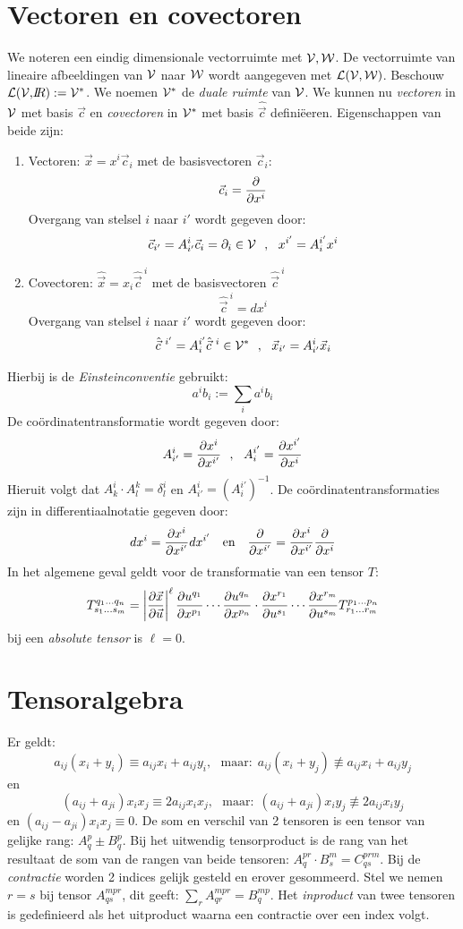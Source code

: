 \documentclass[twoside]{report}
\begin{document}
\section{Vectoren en covectoren}
We noteren een eindig dimensionale vectorruimte met $\cal V, W$. De
vectorruimte van lineaire afbeeldingen van $\cal V$ naar $\cal W$ wordt
aangegeven met $\cal L(V,W)$. Beschouw ${\cal L(V,}I\hspace{-1mm}R):={\cal V}^*$. We
noemen $\cal V^*$ de {\it duale ruimte} van $\cal V$. We kunnen nu
{\it vectoren} in $\cal V$  met basis $\vec{c}$ en {\it covectoren} in 
$\cal V^*$ met basis $\hat{\vec{c}}$ defini\"eeren. Eigenschappen van beide
zijn:
\begin{enumerate}
\item Vectoren: $\vec{x}=x^i\vec{c}_i$ met de basisvectoren $\vec{c}_i$:
      \[
      \vec{c}_i=\frac{\partial }{\partial x^i}
      \]
      Overgang van stelsel $i$ naar $i'$ wordt gegeven door:
      \[
      \vec{c}_{i'}=A_{i'}^i\vec{c}_i=\partial_i\in{\cal V}~~,~~x^{i'}=A_i^{i'}x^i
      \]
\item Covectoren: $\hat{\vec{x}}=x_i\hat{\vec{c}}^{~i}$ met de basisvectoren $\hat{\vec{c}}^{~i}$
      \[
      \hat{\vec{c}}^{~i}=dx^i
      \]
      Overgang van stelsel $i$ naar $i'$ wordt gegeven door:
      \[
      \hat{\vec{c}}^{~i'}=A_i^{i'}\hat{\vec{c}}^{~i}\in{\cal V}^*~~,~~\vec{x}_{i'}=A_{i'}^i\vec{x}_i
      \]
\end{enumerate}
Hierbij is de {\it Einsteinconventie} gebruikt:
\[
a^ib_i:=\sum_ia^ib_i
\]
De co\"ordinatentransformatie wordt gegeven door:
\[
A_{i'}^i=\frac{\partial x^i}{\partial x^{i'}}~~,~~A_i^{i'}=\frac{\partial x^{i'}}{\partial x^i}
\]
Hieruit volgt dat $A_k^i\cdot A_l^k=\delta_l^i$ en $A_{i'}^i=(A_i^{i'})^{-1}$.
\npar
De co\"ordinatentransformaties zijn in differentiaalnotatie gegeven door:
\[
dx^i=\frac{\partial x^i}{\partial x^{i'}}dx^{i'}~~~\mbox{en}~~~\frac{\partial }{\partial x^{i'}}=\frac{\partial x^i}{\partial x^{i'}}\frac{\partial }{\partial x^i}
\]
In het algemene geval geldt voor de transformatie van een tensor $T$:
\[
T_{s_1...s_m}^{q_1...q_n}=\left|\frac{\partial \vec{x}}{\partial \vec{u}}\right|^\ell
\frac{\partial u^{q_1}}{\partial x^{p_1}}\cdots\frac{\partial u^{q_n}}{\partial x^{p_n}}\cdot\frac{\partial x^{r_1}}{\partial u^{s_1}}\cdots\frac{\partial x^{r_m}}{\partial u^{s_m}}T_{r_1...r_m}^{p_1...p_n}
\]
bij een {\it absolute tensor} is $\ell=0$.

\section{Tensoralgebra}
Er geldt:
\[
a_{ij}(x_i+y_i)\equiv a_{ij}x_i+a_{ij}y_i,~~~\mbox{maar:}~~a_{ij}(x_i+y_j)\not\equiv a_{ij}x_i+a_{ij}y_j
\]
en
\[
(a_{ij}+a_{ji})x_ix_j\equiv2a_{ij}x_ix_j,~~~\mbox{maar:}~~(a_{ij}+a_{ji})x_iy_j\not\equiv 2a_{ij}x_iy_j
\]
en $(a_{ij}-a_{ji})x_ix_j\equiv0$.
\npar
De som en verschil van 2 tensoren is een tensor van gelijke rang: $A_q^p\pm
B_q^p$. Bij het uitwendig tensorproduct is de rang van het resultaat de som
van de rangen van beide tensoren: $A_q^{pr}\cdot B_s^m=C_{qs}^{prm}$. Bij de
{\it contractie} worden 2 indices gelijk gesteld en erover gesommeerd. Stel
we nemen $r=s$ bij tensor $A_{qs}^{mpr}$, dit geeft: $\sum\limits_r
A_{qr}^{mpr}=B_q^{mp}$. Het {\it inproduct} van twee tensoren is gedefinieerd
als het uitproduct waarna een contractie over een index volgt.
\end{document}
